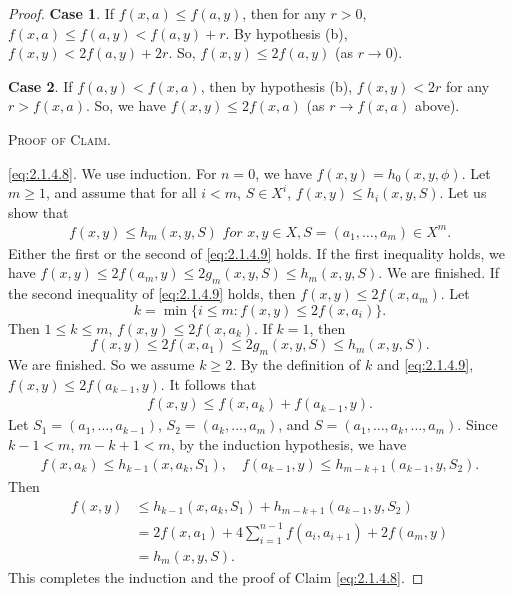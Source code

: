\documentclass[main.tex]{subfiles}
\begin{document}
\begin{proof}
\textbf{Case 1}. If $f(x, a) \le f(a, y)$, then for any $r >0$, $f(x, a) \le f(a, y) <   f(a, y) + r$. 
By hypothesis (b), $f(x, y) < 2 f(a, y)+2r$. So, $f(x, y) \le 2 f(a, y)$ (as  $r \rightarrow 0$).
	
\textbf{Case 2}. If $f(a, y) < f(x, a)$, then by hypothesis (b), $f(x, y) < 2 r$ for any $r > f(x, a)$.
So, we have $f(x, y) \le 2f(x, a)$ (as  $r \rightarrow f(x, a)$ above).
	
\vspace{8pt}
\noindent\textsc{Proof of Claim}.

 \eqref{eq:2.1.4.8}. We use induction. For $n=0$, 
we have $f(x, y) = h_0(x, y, \phi)$. 
Let $m \ge 1$, and assume that for all $i < m$, 
$S\in X^i$, $f(x, y) \le h_i(x, y, S)$. Let us show that 
\begin{gather}
	f(x, y) \le h_{m}(x, y, S) \textit{ for } x, y \in X, S = (a_{1}, \dots, a_{m})\in X^m. \label{eq:2.1.4.10}
\end{gather}
Either the first or the second of \eqref{eq:2.1.4.9} holds. 
If the first inequality holds, we have
	$f(x, y) \le 2 f(a_{m}, y) \le 2 g_{m}(x, y, S) \le h_{m}(x, y, S)$. We are finished.
If the second inequality of  \eqref{eq:2.1.4.9} holds, then $f(x, y) \le 2 f(x, a_{m})$. 
Let 
	$$k = \min \{i \le m: f(x, y) \le 2 f(x, a_{i})\}.$$
Then $1 \le k \le m$, $f(x, y) \le 2 f(x, a_{k})$. If $k = 1$, then 
	$$f(x, y) \le 2 f(x, a_{1}) \le 2 g_{m}(x, y, S) \le h_{m}(x, y, S).$$
We are finished. 
So we assume $k \ge 2$. By the definition of $k$ and \eqref{eq:2.1.4.9}, 
	$f(x, y) \le 2 f(a_{k-1}, y)$. It follows that
\begin{gather}
	f(x, y) \le f(x, a_{k}) + f(a_{k-1}, y). \label{eq:2.1.4.11}
\end{gather}
Let $S_1 = (a_{1}, \dots, a_{k-1})$, $S_2 = (a_{k}, \dots, a_{m})$, 
and $S= (a_{1}, \dots, a_{k}, \dots, a_{m})$. Since $k - 1 < m$, $m - k + 1 < m$, 
by the induction hypothesis, we have
\begin{gather}
	f(x, a_{k}) \le h_{k-1}(x, a_{k}, S_1), \quad
	f(a_{k-1}, y) \le h_{m-k+1}(a_{k-1}, y, S_2). \label{eq:4.1.4.12}
\end{gather}
Then 
\begin{equation}
	\begin{aligned}
			f(x, y)    &\le h_{k-1}(x, a_{k}, S_{1}) + h_{m-k+1}(a_{k-1}, y, S_{2}) \\
			&= 2 f(x, a_{1}) + 4 \sum_{i=1}^{n-1} f(a_{i}, a_{i+1}) + 2 f(a_{m}, y) \\
			&= h_{m}(x, y, S).
	\end{aligned}  \label{eq:2.1.4.13}
\end{equation}
This completes the induction and the proof of Claim \eqref{eq:2.1.4.8}.
\end{proof}
\end{document}
